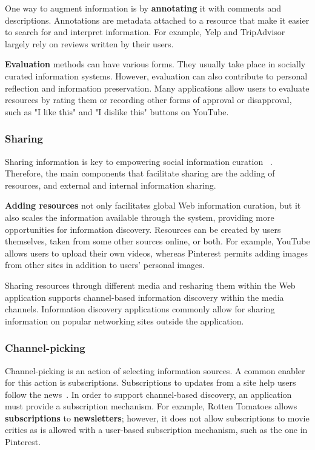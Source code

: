 \documentclass{sigchi}
\begin{document}
{{{One way to augment information is by \textbf{annotating} it with comments and descriptions. Annotations are metadata attached to a resource that make it easier to search for and interpret information. For example, Yelp and TripAdvisor largely rely on reviews written by their users. 

\textbf{Evaluation} methods can have various forms. They usually take place in socially curated information systems. However, evaluation can also contribute to personal reflection and information preservation. Many applications allow users to evaluate resources by rating them or recording other forms of approval or disapproval, such as "I like this" and "I dislike this" buttons on YouTube.
} %

{\subsubsection{Sharing}
Sharing information is key to empowering social information curation ~\cite{beagrie2008digital}. Therefore, the main components that facilitate sharing are the adding of resources, and external and internal information sharing.

\textbf{Adding resources} not only facilitates global Web information curation, but it also scales the information available through the system, providing more opportunities for information discovery. Resources can be created by users themselves, taken from some other sources online, or both. For example, YouTube allows users to upload their own videos, whereas Pinterest permits adding images from other sites in addition to users' personal images. 

Sharing resources through different media and resharing them within the Web application supports channel-based information discovery within the media channels. Information discovery applications commonly allow for sharing information on popular networking sites outside the application.
} %
{\subsubsection{Channel-picking}

Channel-picking is an action of selecting information sources. A common enabler for this action is subscriptions. Subscriptions to updates from a site help users follow the news~\cite{java2007feeds}. In order to support channel-based discovery, an application must provide a subscription mechanism. For example, Rotten Tomatoes allows \textbf{subscriptions} to \textbf{newsletters}; however, it does not allow subscriptions to movie critics as is allowed with a user-based subscription mechanism, such as the one in Pinterest. 

}}}
\end{document}
